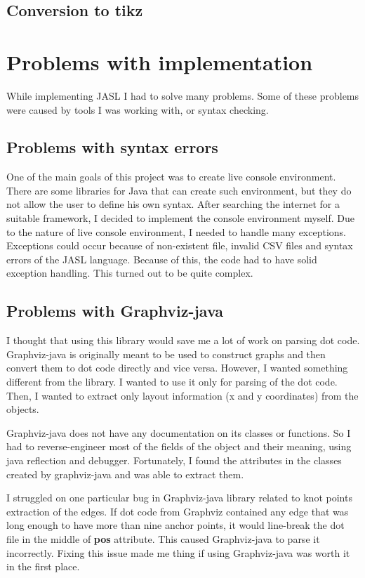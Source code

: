 \documentclass{ctuthesis}
\begin{document}
\subsection{Conversion to tikz}

\section{Problems with implementation}
While implementing JASL I had to solve many problems. Some of these problems were caused by tools I was working with, or syntax checking. 

\subsection{Problems with syntax errors}
One of the main goals of this project was to create live console environment. There are some libraries for Java that can create such environment, but they do not allow the user to define his own syntax. After searching the internet for a suitable framework, I decided to implement the console environment myself. Due to the nature of live console environment, I needed to handle many exceptions. Exceptions could occur because of non-existent file, invalid CSV files and syntax errors of the JASL language. Because of this, the code had to have solid exception handling. This turned out to be quite complex.

\subsection{Problems with Graphviz-java}
\label{subsec:graphviz-java-problems}
I thought that using this library would save me a lot of work on parsing dot code. Graphviz-java is originally meant to be used to construct graphs and then convert them to dot code directly and vice versa. However, I wanted something different from the library. I wanted to use it only for parsing of the dot code. Then, I wanted to extract only layout information (x and y coordinates) from the objects. 

Graphviz-java does not have any documentation on its classes or functions. So I had to reverse-engineer most of the fields of the object and their meaning, using java reflection and debugger. Fortunately, I found the attributes in the classes created by graphviz-java and was able to extract them. 

I struggled on one particular bug in Graphviz-java library related to knot points extraction of the edges. If dot code from Graphviz contained any edge that was long enough to have more than nine anchor points, it would line-break the dot file in the middle of \textbf{pos} attribute. This caused Graphviz-java to parse it incorrectly. Fixing this issue made me thing if using Graphviz-java was worth it in the first place.
\end{document}
